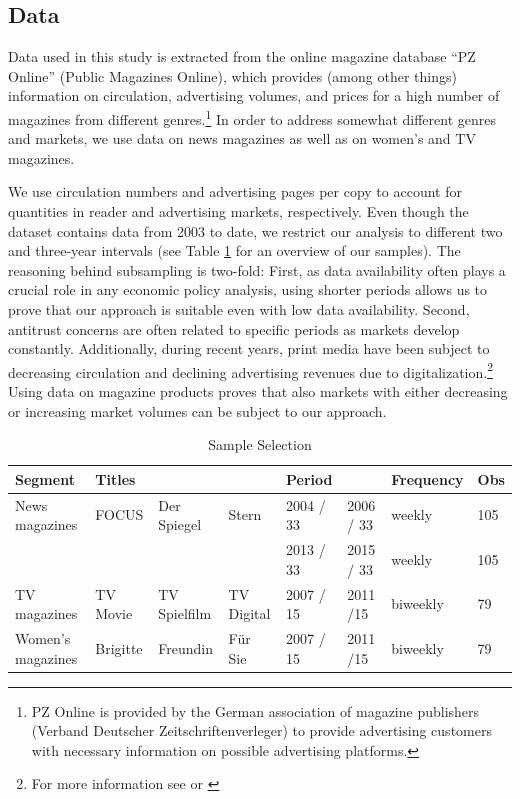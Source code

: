 \documentclass[12pt,a4paper,notitlepage]{article}
\begin{document}
\subsection{Data}\label{sec:data}

Data used in this study is extracted from the online magazine database ``PZ Online'' (Public Magazines Online), which provides (among other things) information on circulation, advertising volumes, and prices for a high number of magazines from different genres.\footnote{PZ Online is provided by the German association of magazine publishers (Verband Deutscher Zeitschriftenverleger) to provide advertising customers with necessary information on possible advertising platforms.} In order to address somewhat different genres and markets, we use data on news magazines as well as on women's and TV magazines. 

We use circulation numbers and advertising pages per copy to account for quantities in reader and advertising markets, respectively. 
Even though the dataset contains data from 2003 to date, we restrict our analysis to different two and three-year intervals (see Table \ref{t_sample selection} for an overview of our samples). The reasoning behind subsampling is two-fold: First, as data availability often plays a crucial role in any economic policy analysis, using shorter periods allows us to prove that our approach is suitable even with low data availability. 
Second, antitrust concerns are often related to specific periods as markets develop constantly. Additionally, during recent years, print media have been subject to decreasing circulation and declining advertising revenues due to digitalization.\footnote{For more information see \cite{cabyova_impact_2014} or \cite{picard_digitization_2011}} Using data on magazine products proves that also markets with either decreasing or increasing market volumes can be subject to our approach.

\begin{table}[ht]\centering
	\caption{Sample Selection}
\begin{adjustbox}{width=\textwidth}	
\begin{tabular}{llllllll}
\hline 
	 Segment 	& Titles & & & Period &  & Frequency & Obs \\ \hline
	News magazines 		& FOCUS & Der Spiegel & Stern & 2004 / 33 & 2006 / 33 & weekly & 105 \\
	 &  &  &  & 2013 / 33 & 2015 / 33 & weekly & 105 \\ \hline
	TV magazines 			& TV Movie & TV Spielfilm & TV Digital & 2007 / 15 & 2011 /15 & biweekly & 79 \\ \hline
	Women's magazines	& Brigitte & Freundin & Für Sie & 2007 / 15 & 2011 /15 & biweekly & 79 \\ \hline
\end{tabular}
	\label{t_sample selection}
\end{adjustbox}
\end{table}
\end{document}
